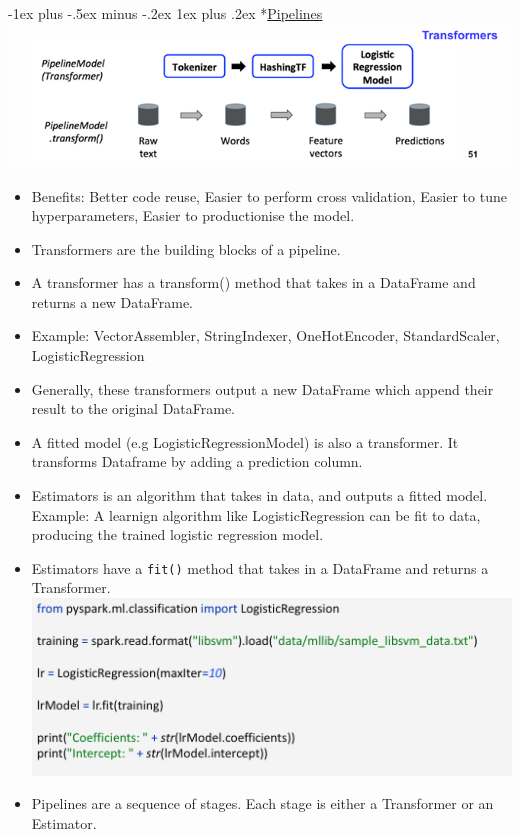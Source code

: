 \documentclass[10pt, landscape]{article}
\makeatletter
\renewcommand{\subsubsection}{\@startsection{subsubsection}{3}{0mm}%
  {-1ex plus -.5ex minus -.2ex}%
  {1ex plus .2ex}%
{\normalfont\small\bfseries}}%
\makeatother
\begin{document}
\begin{multicols*}{4}
  \subsubsection*{\underline{Pipelines}}
  \includegraphics[width=0.95\linewidth]{pipeline_model.png} 
  \begin{itemize}
    \item Benefits: Better code reuse, Easier to perform cross validation, Easier to tune hyperparameters, Easier to productionise the model.
    \item Transformers are the building blocks of a pipeline.
    \item A transformer has a transform() method that takes in a DataFrame and returns a new DataFrame.
    \item Example: VectorAssembler, StringIndexer, OneHotEncoder, StandardScaler, LogisticRegression
    \item Generally, these transformers output a new DataFrame which append their result to the original DataFrame. 
    \item A fitted model (e.g LogisticRegressionModel) is also a transformer. It transforms Dataframe by adding a prediction column.
    \item Estimators is an algorithm that takes in data, and outputs a fitted model. Example: A learnign algorithm like LogisticRegression can be fit to data, producing the trained logistic regression model.
    \item Estimators have a \texttt{fit()} method that takes in a DataFrame and returns a Transformer.
          \includegraphics[width=0.95\linewidth]{estimator.png} 
    \item Pipelines are a sequence of stages. Each stage is either a Transformer or an Estimator.

\end{itemize}
\end{multicols*}
\end{document}
